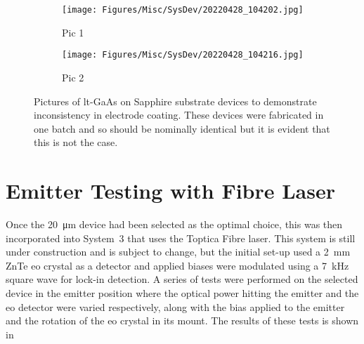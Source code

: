 \begin{figure}[h!]
\centering
\begin{subfigure}{1\textwidth}
    \centering
    \texttt{[image: Figures/Misc/SysDev/20220428\_104202.jpg]}
    \caption{Pic 1}
    \label{fig:devicepic1}
\end{subfigure}
\begin{subfigure}{1\textwidth}
    \centering
    \texttt{[image: Figures/Misc/SysDev/20220428\_104216.jpg]}
    \caption{Pic 2}
    \label{fig:devicepic2}
\end{subfigure}
\captionsetup{font = footnotesize, justification = centering}
\caption[Pictures of LT-GaAs on Sapphire Substrate Devices]{Pictures of \acrshort{lt}\nobreakdash-GaAs on Sapphire substrate devices to demonstrate inconsistency in electrode coating. These devices were fabricated in one batch and so should be nominally identical but it is evident that this is not the case.}
\label{fig:pcdeviceexamplepic}
\end{figure}

\section{Emitter Testing with Fibre Laser}
\label{sec:fibrelaser}
Once the \SI{20}{\micro\metre} device had been selected as the optimal choice, this was then incorporated into System~3 that uses the Toptica Fibre laser. This system is still under construction and is subject to change, but the initial set\nobreakdash-up used a \SI{2}{mm} ZnTe \acrshort{eo} crystal as a detector and applied biases were modulated using a \SI{7}{kHz} square wave for lock\nobreakdash-in detection. A series of tests were performed on the selected device in the emitter position where the optical power hitting the emitter and the \acrshort{eo} detector were varied respectively, along with the bias applied to the emitter and the rotation of the \acrshort{eo} crystal in its mount. The results of these tests is shown in 

